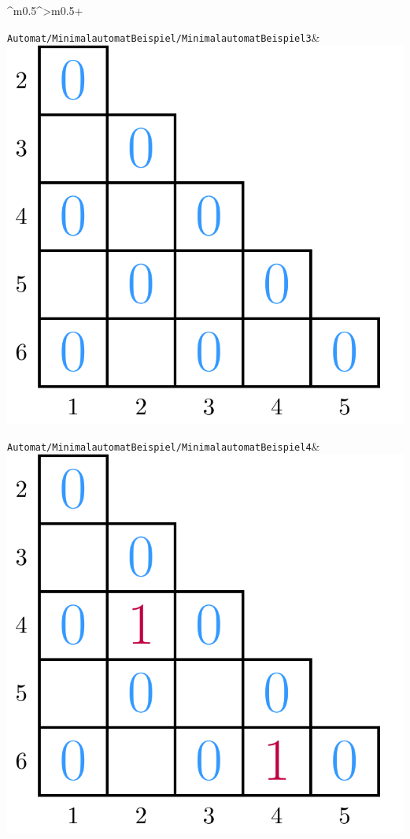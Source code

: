 \documentclass[PLAIN]{Lilly}
\begin{document}
\begin{tabularx}{\linewidth}{^m{0.5\linewidth}^>{\centering\arraybackslash}m{0.5\linewidth}+}
\midrule {} {}\verb|Automat/MinimalautomatBeispiel/MinimalautomatBeispiel3|& \includegraphics[width=0.8\linewidth]{Automat/MinimalautomatBeispiel/MinimalautomatBeispiel3-pdf.pdf}\\
\midrule {} {}\verb|Automat/MinimalautomatBeispiel/MinimalautomatBeispiel4|& \includegraphics[width=0.8\linewidth]{Automat/MinimalautomatBeispiel/MinimalautomatBeispiel4-pdf.pdf}\\

\end{tabularx}
\end{document}
